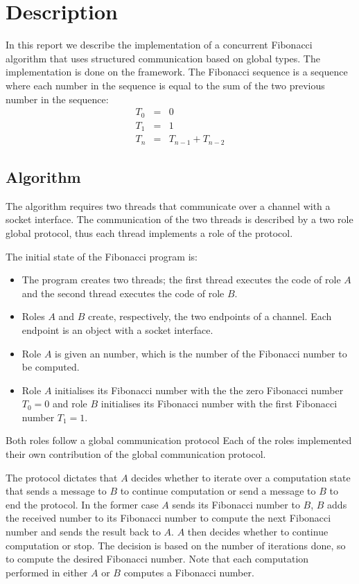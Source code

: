\section{Description}

In this report we describe the implementation of a
concurrent Fibonacci algorithm that uses structured
communication based on global types.
The implementation is done on the \Mungo framework.
The Fibonacci sequence is a sequence where each
number in the sequence is equal to the sum
of the two previous number in the sequence:
%
\begin{eqnarray*}
	T_0 &=& 0 \\
	T_1 &=& 1\\
	T_n &=& T_{n-1} + T_{n-2}
\end{eqnarray*}

\subsection{Algorithm}
\label{subsec:algorithm}
The algorithm requires two threads that communicate
over a channel with a socket interface.
The communication of the two threads is described by a
two role global protocol, thus each thread implements
a role of the protocol.

The initial state of the Fibonacci program is:
%
\begin{itemize}
	\item	The program creates two threads; the first thread
			executes the code of role $A$ and the second thread
			executes the code of role $B$.

	\item	Roles $A$ and $B$ create, respectively,
			the two endpoints of a channel. Each endpoint
			is an object with a socket interface.

	\item	Role $A$ is given an number, which is the number
			of the Fibonacci number to be computed.

	\item	Role $A$ initialises its Fibonacci number
			with the
			the zero Fibonacci number $T_0 = 0$ and 
			role $B$ initialises its Fibonacci number with
			the first Fibonacci number $T_1 = 1$.
\end{itemize}

Both roles follow a global communication protocol
Each of the roles implemented their own contribution
of the global communication protocol.

The protocol dictates that $A$ decides whether to iterate over a computation
state that sends a message to $B$ to continue computation or send a message to $B$
to end the protocol.
In the former case $A$ sends its Fibonacci number to $B$, $B$ adds
the received number to its Fibonacci number to 
compute the next Fibonacci number and sends the result back to $A$.
$A$ then decides whether to continue computation or stop. The decision
is based on the number of iterations done, so to compute the desired Fibonacci number.
Note that each computation performed in either $A$ or $B$ computes a
Fibonacci number.


